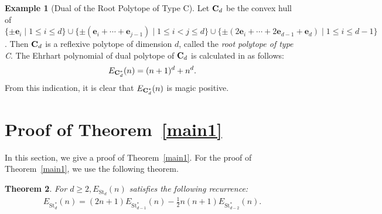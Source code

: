 \documentclass[a4paper,reqno,11pt, oneside]{amsart}
\newcommand{\eb}{\mathbf{e}}
\newtheorem{thm}{Theorem}[section]
\theoremstyle{definition}
\newtheorem{ex}[thm]{Example}
\theoremstyle{remark}
\begin{document}
\begin{ex}[Dual of the Root Polytope of Type C]\label{typeC}
Let ${\bf C}_d$ be the convex hull of $\{\pm \eb_i \mid 1 \leq i \leq d \} \cup \{ \pm (\eb_i+\cdots+\eb_{j-1}) \mid 1 \leq i < j \leq d \} \cup \{\pm(2\eb_i+\cdots+2\eb_{d-1}+\eb_d) \mid 1 \leq i \leq d-1\}$. 
Then ${\bf C}_d$ is a reflexive polytope of dimension $d$, called the \textit{root polytope of type C}. 
The Ehrhart polynomial of dual polytope of ${\bf C}_d$ is calculated in \cite[Theorem 1.1]{HY} as follows: 
$$E_{{\bf C}_d^\ast}(n)=(n+1)^d + n^d.$$
From this indication, it is clear that $E_{{\bf C}_d^\ast}(n)$ is magic positive.
\end{ex}



\section{Proof of Theorem~\ref{main1}}\label{sec:main1}
In this section, we give a proof of Theorem~\ref{main1}. 
For the proof of Theorem~\ref{main1}, we use the following theorem.
\begin{thm}
For $d \geq 2, E_{\mathrm{St}_d}(n)$ satisfies the following recurrence:
\begin{align}
  E_{\mathrm{St}_d^\ast}(n) = (2n+1)E_{\mathrm{St}_{d-1}^\ast}(n) - \frac{1}{2}n(n+1)E_{\mathrm{St}_{d-2}^\ast}(n).
\end{align}
\end{thm}
\end{document}
